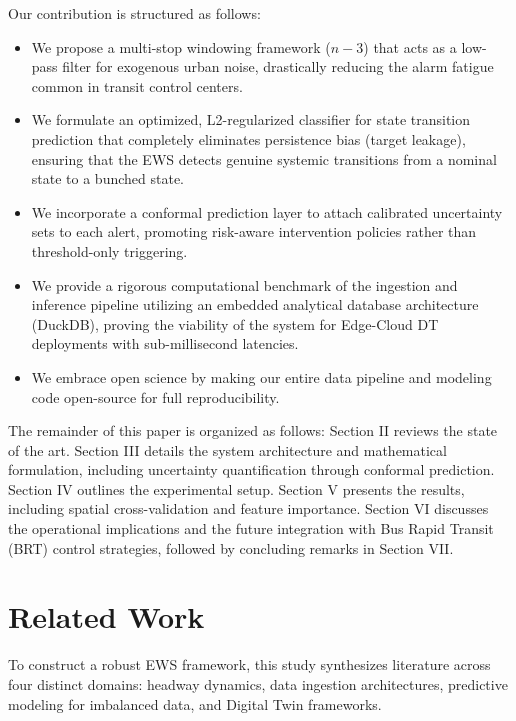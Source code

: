 \documentclass[journal,twocolumn]{IEEEtran}
\begin{document}
Our contribution is structured as follows:
\begin{itemize}
	\item We propose a multi-stop windowing framework ($n-3$) that acts as a low-pass filter for exogenous urban noise, drastically reducing the alarm fatigue common in transit control centers.
	\item We formulate an optimized, L2-regularized classifier for state transition prediction that completely eliminates persistence bias (target leakage), ensuring that the EWS detects genuine systemic transitions from a nominal state to a bunched state.
	\item We incorporate a conformal prediction layer to attach calibrated uncertainty sets to each alert, promoting risk-aware intervention policies rather than threshold-only triggering.
	\item We provide a rigorous computational benchmark of the ingestion and inference pipeline utilizing an embedded analytical database architecture (DuckDB), proving the viability of the system for Edge-Cloud DT deployments with sub-millisecond latencies.
	\item We embrace open science by making our entire data pipeline and modeling code open-source for full reproducibility.
\end{itemize}

The remainder of this paper is organized as follows: Section II reviews the state of the art. Section III details the system architecture and mathematical formulation, including uncertainty quantification through conformal prediction. Section IV outlines the experimental setup. Section V presents the results, including spatial cross-validation and feature importance. Section VI discusses the operational implications and the future integration with Bus Rapid Transit (BRT) control strategies, followed by concluding remarks in Section VII.

\section{Related Work}

To construct a robust EWS framework, this study synthesizes literature across four distinct domains: headway dynamics, data ingestion architectures, predictive modeling for imbalanced data, and Digital Twin frameworks.
\end{document}
